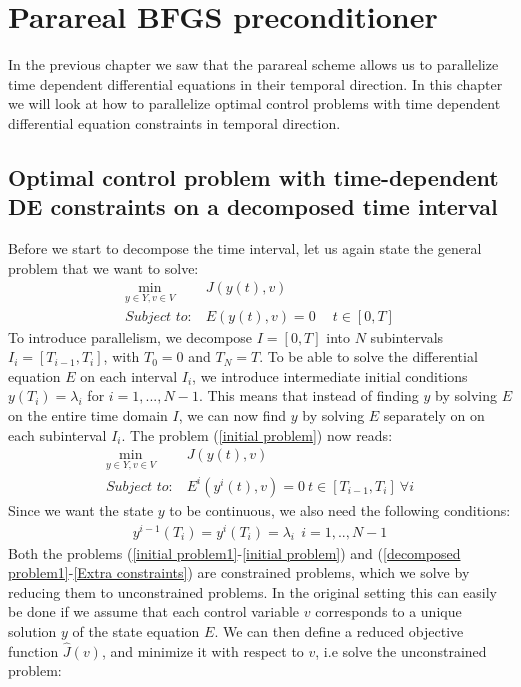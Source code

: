 \chapter{Parareal BFGS preconditioner}
In the previous chapter we saw that the parareal scheme allows us to parallelize time dependent differential equations in their temporal direction. In this chapter we will look at how to parallelize optimal control problems with time dependent differential equation constraints in temporal direction.  
\section{Optimal control problem with time-dependent DE constraints on a decomposed time interval}
Before we start to decompose the time interval, let us again state the general problem that we want to solve:
\begin{align}
\underset{y\in Y,v\in V}{\text{min}} \ &J(y(t),v) \label{initial problem1}\\
\textit{Subject to:} \ &E(y(t),v)=0 \ \quad t\in [0,T] \label{initial problem}
\end{align}
To introduce parallelism, we decompose $I=[0,T]$ into $N$ subintervals $I_i=[T_{i-1},T_i]$, with $T_0=0$ and $T_N=T$. To be able to solve the differential equation $E$ on each interval $I_i$, we introduce intermediate initial conditions $y(T_i)=\lambda_i$ for $i=1,...,N-1$. This means that instead of finding $y$ by solving $E$ on the entire time domain $I$, we can now find $y$ by solving $E$ separately on on each subinterval $I_i$. The problem (\ref{initial problem}) now reads:
\begin{align}
\underset{y\in Y,v\in V}{\text{min}} \ &J(y(t),v)  \label{decomposed problem1}\\
\textit{Subject to:} \ &E^i(y^i(t),v)=0 \ t\in [T_{i-1},T_i] \ \forall i \label{decomposed problem}
\end{align} 
Since we want the state $y$ to be continuous, we also need the following conditions:
\begin{align}
y^{i-1}(T_i)=y^i(T_i)=\lambda_i \ \ i=1,..,N-1 \label{Extra constraints}
\end{align} 
Both the problems (\ref{initial problem1}-\ref{initial problem}) and (\ref{decomposed problem1}-\ref{Extra constraints}) are constrained problems, which we solve by reducing them to unconstrained problems. In the original setting this can easily be done if we assume that each control variable $v$ corresponds to a unique solution $y$ of the state equation $E$. We can then define a reduced objective function $\hat{J}(v)$, and minimize it with respect to $v$, i.e solve the unconstrained problem:
